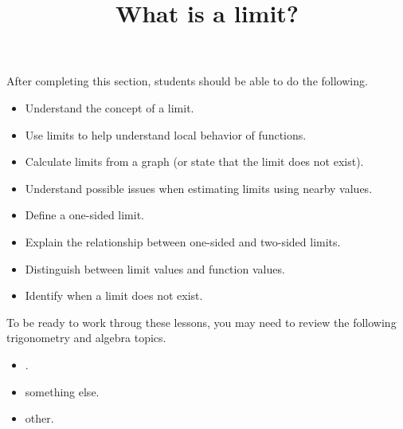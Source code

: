 \documentclass{ximera}
\title{What is a limit?}
\begin{document}
\begin{abstract}
\end{abstract}

\maketitle

\begin{sectionOutcomes}
After completing this section, students should be able to do the following.

\begin{itemize}
	\item Understand the concept of a limit.
    \item Use limits to help understand local behavior of functions.
	\item Calculate limits from a graph (or state that the limit does not exist).
	\item Understand possible issues when estimating limits using
          nearby values.
	\item Define a one-sided limit.
	\item Explain the relationship between one-sided and two-sided limits.
	\item Distinguish between limit values and function values.
	\item Identify when a limit does not exist.
\end{itemize}
\end{sectionOutcomes}



To be ready to work throug these lessons, you may need to review the following trigonometry and algebra topics.
\begin{itemize}
    \item {}.
    \item something else.
    \item other.
\end{itemize}
\end{document}

